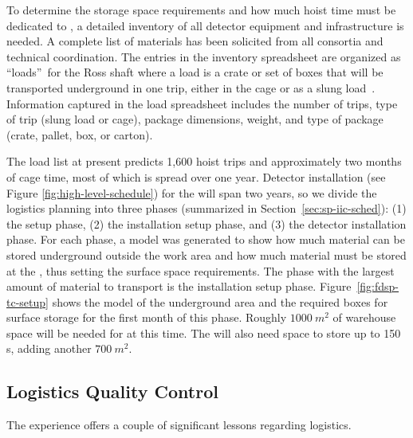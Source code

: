 To determine the %
storage space requirements and how much hoist time must be dedicated to , a detailed inventory of all   detector equipment and infrastructure is needed. 
A complete list of materials has been solicited from all consortia and technical coordination. 
The entries in the inventory spreadsheet are organized as \textquotedblleft loads\textquotedblright \ for the Ross shaft where a load is a crate or set of boxes that will be transported underground in one trip, either in the cage or as a slung load~\cite{bib:docdb8426}. 
Information captured in the load spreadsheet includes the number of  
trips, type of trip (slung load or cage), package dimensions, weight, and type of package (crate, pallet, box, or carton). 

The load list at present predicts 1,600 hoist trips and approximately two  months of cage time, most of which is spread over one year. 
Detector installation (see Figure \ref{fig:high-level-schedule}) for the  will span two years, so we divide the logistics planning into three phases (summarized in Section~\ref{sec:sp-iic-sched}): (1) the  setup phase, (2) the installation setup phase, and (3) the detector installation phase. 
For each phase, a \threed model was generated to show how much material can be stored underground outside the work area and how much material must be stored %
at the , thus setting the surface space requirements. 
The phase with the largest amount of material to transport is the installation setup phase.  
Figure~\ref{fig:fdsp-tc-setup} shows the model of the underground area and the required boxes for surface storage for %
the first month of this phase. %
Roughly $\SI{1000}{m^2}$ of warehouse space will be needed for  at this time.  The  will also need space to store up to 150 s, 
adding another $\SI{700}{m^2}$. %


\subsection{Logistics Quality Control}
\label{sec:fdsp-tc-log-qaqc}


 
The  experience offers a couple of significant lessons regarding logistics.

